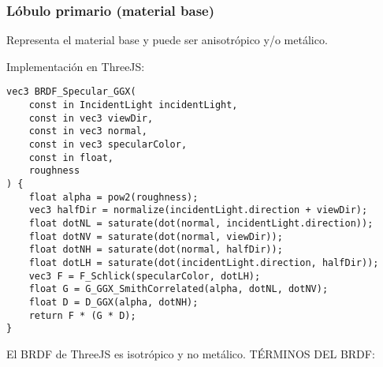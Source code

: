         \subsubsection{L\'obulo primario (material base)}
            Representa el material base y puede ser anisotr\'opico y/o  met\'alico.

            Implementaci\'on en ThreeJS:
            \singlespacing
            \begin{lstlisting}[caption=My Javascript Example]
vec3 BRDF_Specular_GGX(
    const in IncidentLight incidentLight,
    const in vec3 viewDir,
    const in vec3 normal,
    const in vec3 specularColor,
    const in float,
    roughness
) {
    float alpha = pow2(roughness);
    vec3 halfDir = normalize(incidentLight.direction + viewDir);
    float dotNL = saturate(dot(normal, incidentLight.direction));
    float dotNV = saturate(dot(normal, viewDir));
    float dotNH = saturate(dot(normal, halfDir));
    float dotLH = saturate(dot(incidentLight.direction, halfDir));
    vec3 F = F_Schlick(specularColor, dotLH);
    float G = G_GGX_SmithCorrelated(alpha, dotNL, dotNV);
    float D = D_GGX(alpha, dotNH);
    return F * (G * D);
}
            \end{lstlisting}
            \singlespacing
            El BRDF de ThreeJS es isotrópico y no metálico.
            \singlespacing
            T\'ERMINOS DEL BRDF:
            \singlespacing
